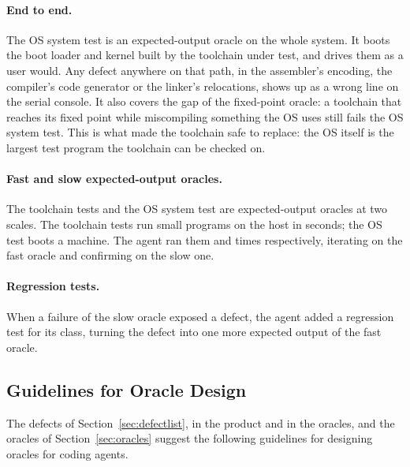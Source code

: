 \documentclass{article}
\begin{document}
\paragraph{End to end.} The OS system test is an expected-output oracle on the whole
system. It boots the boot loader and kernel built by the toolchain under test, and drives
them as a user would. Any defect anywhere on that path, in the assembler's encoding, the
compiler's code generator or the linker's relocations, shows up as a wrong line on the
serial console. It also covers the gap of the fixed-point oracle: a toolchain that
reaches its fixed point while miscompiling something the OS uses still fails the OS
system test. This is what made the toolchain safe to replace: the OS itself is the
largest test program the toolchain can be checked on.

\paragraph{Fast and slow expected-output oracles.} The toolchain tests and the OS system
test are expected-output oracles at two scales. The toolchain tests run
\ntoolchainfixtures{} small programs on the host in seconds; the OS test boots a machine.
The agent ran them \ntoolchaintestruns{} and \nostestruns{} times respectively, iterating
on the fast oracle and confirming on the slow one.

\paragraph{Regression tests.} When a failure of the slow oracle exposed a defect, the
agent added a regression test for its class, turning the defect into one more expected
output of the fast oracle.

\subsection{Guidelines for Oracle Design}\label{sec:guidelines}

The defects of Section~\ref{sec:defectlist}, in the product and in the oracles, and the
oracles of Section~\ref{sec:oracles} suggest the following guidelines
for designing oracles for coding agents. 
\end{document}
